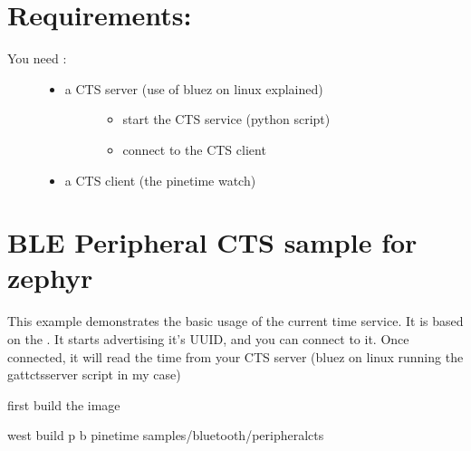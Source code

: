 \documentclass[letterpaper,10pt,english]{sphinxmanual}
\begin{document}
\section{Requirements:}
\label{\detokenize{current-time:requirements}}\begin{description}
\item[{You need :}] \leavevmode\begin{itemize}
\item {} \begin{description}
\item[{a CTS server (use of bluez on linux explained)}] \leavevmode\begin{itemize}
\item {} 
start the CTS service (python script)

\item {} 
connect to the CTS client

\end{itemize}

\end{description}

\item {} 
a CTS client (the pinetime watch)

\end{itemize}

\end{description}


\section{BLE Peripheral CTS sample for zephyr}
\label{\detokenize{current-time:ble-peripheral-cts-sample-for-zephyr}}
This example demonstrates the basic usage of the current time service.
It is based on the .
It starts advertising it’s UUID, and you can connect to it.
Once connected, it will read the time from your CTS server (bluez on linux running the gatt\sphinxhyphen{}cts\sphinxhyphen{}server script in my case)

first build the image

\begin{sphinxVerbatim}[commandchars=\\\{\}]
  west build \PYGZhy{}p \PYGZhy{}b pinetime samples/bluetooth/peripheral\PYGZhy{}cts
\end{sphinxVerbatim}
\end{document}
